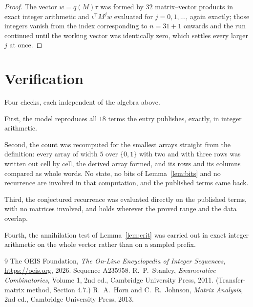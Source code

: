 \documentclass[11pt,a4paper]{article}
\theoremstyle{plain}
\theoremstyle{definition}
\begin{document}
\begin{proof}
The vector $w=q(M)\tau$ was formed by $32$ matrix--vector products in exact integer
arithmetic and $\iota^{\!\top}M^{j}w$ evaluated for $j=0,1,\dots$, again exactly; those
integers vanish from the index corresponding to $n=31+1$ onwards and the run continued
until the working vector was identically zero, which settles every larger $j$ at once.
\end{proof}

\section{Verification}

Four checks, each independent of the algebra above.

First, the model reproduces all $18$ terms the entry publishes, exactly, in integer
arithmetic.

Second, the count was recomputed for the smallest arrays straight from the definition: every
array of width $5$ over $\{0,1\}$ with two and with three rows was written out cell by cell,
the derived array formed, and its rows and its columns compared as whole words. No state, no
bits of Lemma~\ref{lem:bits} and no recurrence are involved in that computation, and the
published terms came back.

Third, the conjectured recurrence was evaluated directly on the published terms, with no
matrices involved, and holds wherever the proved range and the data overlap.

Fourth, the annihilation test of Lemma~\ref{lem:crit} was carried out in exact integer
arithmetic on the whole vector rather than on a sampled prefix.

\begin{thebibliography}{9}
 The OEIS Foundation, \emph{The On-Line Encyclopedia of Integer
Sequences}, \url{https://oeis.org}, 2026. Sequence A235958.
 R.~P.~Stanley, \emph{Enumerative Combinatorics}, Volume 1, 2nd ed.,
Cambridge University Press, 2011. (Transfer-matrix method, Section 4.7.)
 R.~A.~Horn and C.~R.~Johnson, \emph{Matrix Analysis}, 2nd ed., Cambridge
University Press, 2013.
\end{thebibliography}
\end{document}
